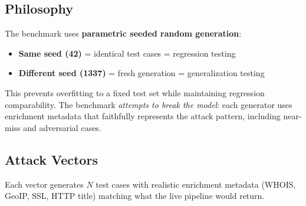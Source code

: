 \documentclass[11pt,a4paper]{article}
\begin{document}
\subsection{Philosophy}

The benchmark uses \textbf{parametric seeded random generation}:

\begin{itemize}[noitemsep]
  \item \textbf{Same seed (42)} = identical test cases = regression
        testing
  \item \textbf{Different seed (1337)} = fresh generation =
        generalization testing
\end{itemize}

This prevents overfitting to a fixed test set while maintaining
regression comparability. The benchmark \emph{attempts to break the
model}: each generator uses enrichment metadata that faithfully
represents the attack pattern, including near-miss and adversarial
cases.

\subsection{Attack Vectors}

Each vector generates $N$ test cases with realistic enrichment
metadata (WHOIS, GeoIP, SSL, HTTP title) matching what the live
pipeline would return.
\end{document}
